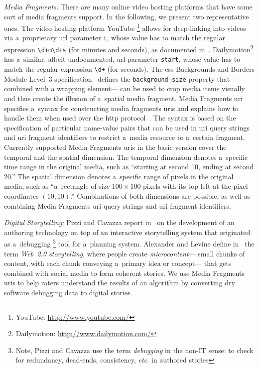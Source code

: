 \documentclass{article}
\begin{document}
\noindent \textit{Media Fragments:}
There are many online video hosting platforms
that have some sort of media fragments support.
In the following, we present two representative ones.
The video hosting platform YouTube%
\footnote{YouTube: \url{http://www.youtube.com/}}
allows for deep-linking into videos
via a~proprietary {\sc url} parameter \texttt{t},
whose value has to match the regular expression
\texttt{\textbackslash d+m\textbackslash d+s} (for minutes and seconds),
as documented in~\cite{youtube2008link}.
Dailymotion\footnote{Dailymotion: \url{http://www.dailymotion.com/}}
has a~similar, albeit undocumented, {\sc url} parameter \texttt{start},
whose value has to match the regular expression
\texttt{\textbackslash d+} (for seconds).
The {\sc css} Backgrounds and Borders Module Level~3 specification~\cite{bos2012css3}
defines the \texttt{background-size} property
that---combined with a wrapping element---%
can be used to crop media items visually
and thus create the illusion of a~spatial media fragment.
Media Fragments {\sc uri}~\cite{troncy2012mediafragments} specifies
a~syntax for constructing media fragments {\sc uri}s
and explains how to handle them
when used over the {\sc http} protocol~\cite{fielding1999http}.
The syntax is based on the specification of particular name-value pairs
that can be used in {\sc uri} query strings and {\sc uri} fragment identifiers
to restrict a~media resource to a~certain fragment.
Currently supported Media Fragments {\sc uri}s in the basic version
cover the temporal and the spatial dimension.
The temporal dimension denotes a~specific time range in the original media,
such as ``starting at second 10, ending at second 20.''
The spatial dimension denotes a~specific range of pixels in the original media,
such as ``a~rectangle of size $ 100 \times 100 $ pixels
with its top-left at the pixel coordinates $ (10, 10) $.''
Combinations of both dimensions are possible,
as well as combining Media Fragments {\sc uri} query strings
and {\sc uri} fragment identifiers.

\noindent \textit{Digital Storytelling:}
Pizzi and Cavazza report in~\cite{pizzi2008debugging} on the development of
an authoring technology on top of an interactive storytelling system
that originated as a~debugging%
\footnote{Note, Pizzi and Cavazza use the term \emph{debugging} in the non-IT sense:
to check for redundancy, dead-ends, consistency, \emph{etc.} in authored stories}
tool for a~planning system.
Alexander and Levine define in~\cite{alexander2008storytelling}
the term \emph{Web~2.0 storytelling}, where people create \emph{microcontent}---%
small chunks of content, with each chunk conveying a~primary idea or concept---%
that gets combined with social media to form coherent stories.
We use Media Fragments {\sc uri}s to help raters understand
the results of an algorithm by converting dry software debugging data
to digital stories.
\end{document}
